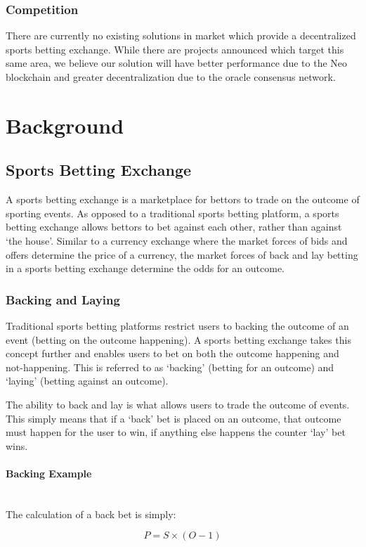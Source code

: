 \documentclass{article}
\newcommand{\myparagraph}[1]{\paragraph{#1}\mbox{}\\ \newline}
\begin{document}
		\subsubsection{Competition}
There are currently no existing solutions in market which provide a decentralized sports betting exchange. While there are projects announced which target this same area, we believe our solution will have better performance due to the Neo blockchain and greater decentralization due to the oracle consensus network.

\pagebreak

\section{Background}

	\subsection{Sports Betting Exchange}
A sports betting exchange is a marketplace for bettors to trade on the outcome of sporting events. As opposed to a traditional sports betting platform, a sports betting exchange allows bettors to bet against each other, rather than against ‘the house’. Similar to a currency exchange where the market forces of bids and offers determine the price of a currency, the market forces of back and lay betting in a sports betting exchange determine the odds for an outcome.

		\subsubsection{Backing and Laying}
Traditional sports betting platforms restrict users to backing the outcome of an event (betting on the outcome happening). A sports betting exchange takes this concept further and enables users to bet on both the outcome happening and not-happening. This is referred to as ‘backing’ (betting for an outcome) and ‘laying’ (betting against an outcome). 

The ability to back and lay is what allows users to trade the outcome of events. This simply means that if a ‘back’ bet is placed on an outcome, that outcome must happen for the user to win, if anything else happens the counter ‘lay’ bet wins.

				\myparagraph{Backing Example}
\medskip 
The calculation of a back bet is simply:  

\begin{equation}
P = S\times(O - 1)\label{eq:backing}
\end{equation}
\end{document}
